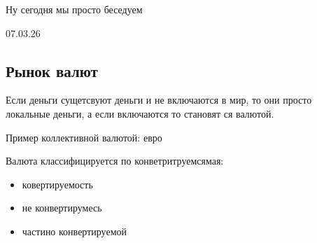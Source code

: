 \documentclass{article}
\begin{document}
    \Large{}

    Ну сегодня мы просто беседуем

    \vspace{1cm}
    \large{07.03.26}

    \vspace{2mm}
    \Large{}

    \subsection{Рынок валют} 

    Если деньги сущетсвуют деньги и не включаются в мир, то они просто 
    локальные деньги, а если включаются то становят ся валютой. 

    Пример коллективной валютой: евро

    Валюта классифицируется по конветритруемсямая: 

    \begin{itemize}
        \item ковертируемость
        \item не конвертирумесь
        \item частино конвертируемой
    \end{itemize}
\end{document}
